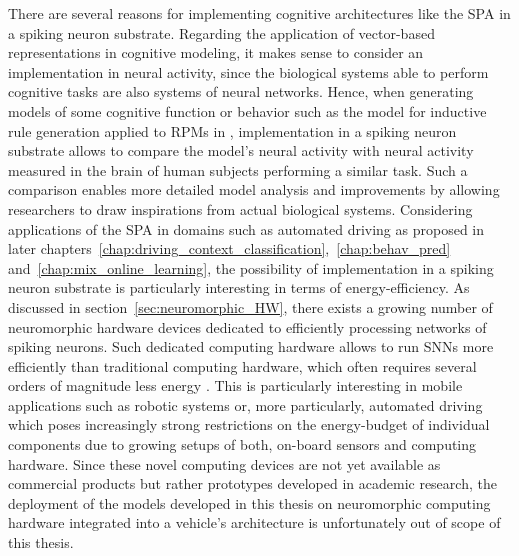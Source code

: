 There are several reasons for implementing cognitive architectures like the \ac{SPA} in a spiking neuron substrate.
Regarding the application of vector-based representations in cognitive modeling, it makes sense to consider an implementation in neural activity, since the biological systems able to perform cognitive tasks are also systems of neural networks.
Hence, when generating models of some cognitive function or behavior such as the model for inductive rule generation applied to \acp{RPM} in \textcite{Rasmussen2011}, implementation in a spiking neuron substrate allows to compare the model's neural activity with neural activity measured in the brain of human subjects performing a similar task.
Such a comparison enables more detailed model analysis and improvements by allowing researchers to draw inspirations from actual biological systems.
Considering applications of the \ac{SPA} in domains such as automated driving as proposed in later chapters~\ref{chap:driving_context_classification},~\ref{chap:behav_pred} and~\ref{chap:mix_online_learning}, the possibility of implementation in a spiking neuron substrate is particularly interesting in terms of energy-efficiency.
As discussed in section~\ref{sec:neuromorphic_HW}, there exists a growing number of neuromorphic hardware devices dedicated to efficiently processing networks of spiking neurons.
Such dedicated computing hardware allows to run \acp{SNN} more efficiently than traditional computing hardware, which often requires several orders of magnitude less energy \parencite{Hunsberger2016}.
This is particularly interesting in mobile applications such as robotic systems or, more particularly, automated driving which poses increasingly strong restrictions on the energy-budget of individual components due to growing setups of both, on-board sensors and computing hardware.
Since these novel computing devices are not yet available as commercial products but rather prototypes developed in academic research, the deployment of the models developed in this thesis on neuromorphic computing hardware integrated into a vehicle's architecture is unfortunately out of scope of this thesis. 

